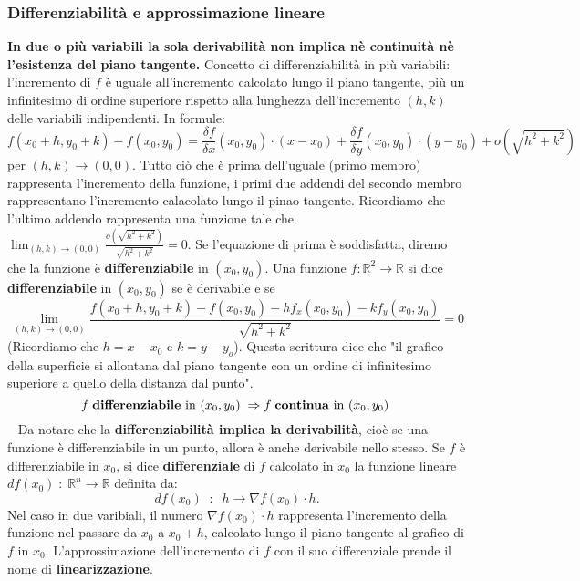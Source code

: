 \subsubsection{Differenziabilità e approssimazione lineare}
\textbf{In due o più variabili la sola derivabilità non implica nè continuità nè l'esistenza del piano tangente.}\newline
\newline
Concetto di differenziabilità in più variabili: l'incremento di $f$ è uguale all'incremento calcolato lungo il piano tangente, più un infinitesimo di ordine superiore rispetto alla lunghezza dell'incremento $(h,k)$ delle variabili indipendenti. In formule:
\[
    f(x_0 + h, y_0 + k) - f(x_0, y_0) = \frac{\delta f}{\delta x} (x_0,y_0) \cdot (x-x_0) + \frac{\delta f}{\delta y}(x_0, y_0) \cdot (y-y_0) + o(\sqrt{h^2 + k^2})
\]
per $(h,k) \rightarrow  (0,0)$.\newline
Tutto ciò che è prima dell'uguale (primo membro) rappresenta l'incremento della funzione, i primi due addendi del secondo membro rappresentano l'incremento calacolato lungo il pinao tangente. Ricordiamo che l'ultimo addendo rappresenta una funzione tale che $\lim_{(h,k)\rightarrow (0,0)}\frac{o(\sqrt{h^2 + k^2})}{\sqrt{h^2 + k^2}} = 0$.\newline
Se l'equazione di prima è soddisfatta, diremo che la funzione è \textbf{differenziabile} in $(x_0, y_0)$.\newline
\newline
Una funzione $f: \mathbb{R}^2 \rightarrow  \mathbb{R}$ si dice \textbf{differenziabile} in $(x_0, y_0)$ se è derivabile e se
\[
    \lim_{(h,k)\rightarrow (0,0)} \frac{f(x_0 + h, y_0+k)-f(x_0,y_0) - h f_x(x_0, y_0) - k f_y(x_0,y_0)}{\sqrt{h^2 + k^2}} = 0
\]
(Ricordiamo che $h = x-x_0$ e $k = y-y_o$).\newline
\newline
Questa scrittura dice che "il grafico della superficie si allontana dal piano tangente con un ordine di infinitesimo superiore a quello della distanza dal punto".
\newline
\[
    f \;\text{\textbf{differenziabile} in $(x_0, y_0)$}\; \Rightarrow f \; \text{\textbf{continua} in $(x_0,y_0)$}\;
\]
\ \newline
Da notare che la \textbf{differenziabilità implica la derivabilità}, cioè se una funzione è differenziabile in un punto, allora è anche derivabile nello stesso.\newline
\newline
Se $f$ è differenziabile in $x_0$, si dice \textbf{differenziale} di $f$ calcolato in $x_0$ la funzione lineare $df(x_0) \;:\; \mathbb{R}^n \rightarrow  \mathbb{R}$ definita da:
\[
    df(x_0) \;\;:\;\;h \rightarrow  \nabla f(x_0) \cdot h.
\] 
Nel caso in due varibiali, il numero $\nabla f(x_0) \cdot h$ rappresenta l'incremento della funzione nel passare da $x_0$ a $x_0+h$, calcolato lungo il piano tangente al grafico di $f$ in $x_0$.\newline
\newline
L'approssimazione dell'incremento di $f$ con il suo differenziale prende il nome di \textbf{linearizzazione}.
